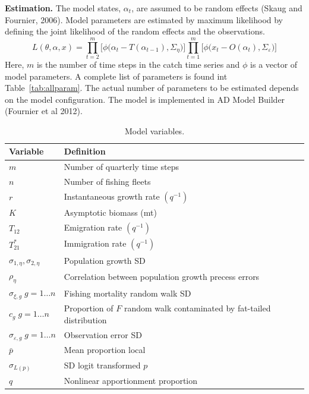 \documentclass[12pt,letterpaper]{article}
\begin{document}
{\bf Estimation.} The model states, $\alpha_t$, are assumed to be random
effects (Skaug and Fournier, 2006). Model parameters are estimated by
maximum likelihood by defining the joint likelihood of the random
effects and the observations.
\begin{equation}
L(\theta,\alpha,x)=
\prod^m_{t=2}\big[\phi\big(\alpha_t-T(\alpha_{t-1}), \Sigma_\eta\big)\big]
\prod^m_{t=1}\big[\phi\big(x_t-O(\alpha_t), \Sigma_\varepsilon\big)\big]
\end{equation}
Here, $m$ is the number of time steps in the catch time series and
$\phi$ is a vector of model parameters. A complete list of
parameters is found int Table~\ref{tab:allparam}. The actual number of
parameters to be estimated depends on the model configuration. The
model is implemented in AD Model Builder (Fournier et al 2012).



\begin{table}
\label{tab:allvars}
\caption{Model variables.}
\begin{center}
\begin{tabular}{ll}
\hline
Variable & Definition\\
\hline
\hline
$m$ & Number of quarterly time steps\\
$n$ & Number of fishing fleets\\
\hline
\hline
$r$ & Instantaneous growth rate $(q^{-1})$\\
$K$ & Asymptotic biomass (mt) \\
$T_{12}$ & Emigration rate $(q^{-1})$\\
$T^*_{21}$& Immigration rate $(q^{-1})$\\
$\sigma_{1,\eta}, \sigma_{2,\eta}$ & Population growth SD\\
$\rho_\eta$ & Correlation between population growth precess errors\\
$\sigma_{\xi,g}\; g=1\ldots n$ & Fishing mortality random walk SD\\
$c_g\; g=1\ldots n$ & Proportion of $F$ random walk contaminated by 
fat-tailed distribution\\
$\sigma_{\varepsilon,g}\; g=1\ldots n$ & Observation error SD \\
$\bar{p}$ & Mean proportion local\\
$\sigma_{L(p)}$ & SD logit transformed $p$\\
$q$ & Nonlinear apportionment proportion\\
\hline
\end{tabular}
\end{center}
\end{table}
\end{document}
